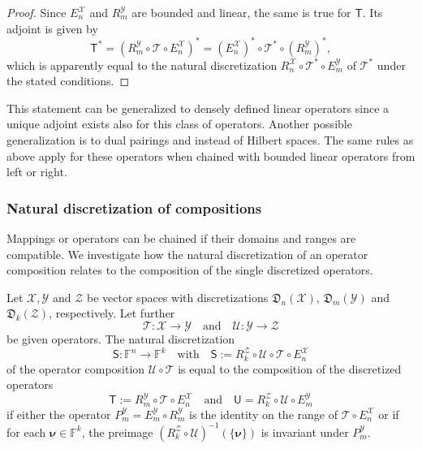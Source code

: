\documentclass[a4paper]{paper}
\newcommand{\Discr}{\mathfrak{D}}
\newcommand{\Spc}[1]{\mathscr{#1}}
\newcommand{\Field}{\mathbb{F}}
\newcommand{\Op}[1]{\mathcal{#1}}
\newcommand{\DiscOp}[1]{\mathsf{#1}}
\newcommand*{\EXT}[2]{\ensuremath{E_{#1}^{#2}}}
\newcommand*{\REST}[2]{\ensuremath{R_{#1}^{#2}}}
\newcommand*{\PROJ}[2]{\ensuremath{P_{#1}^{#2}}}
\newcommand*{\RnX}{\ensuremath{\REST{n}{\Spc{X}}}}
\newcommand*{\RmY}{\ensuremath{\REST{m}{\Spc{Y}}}}
\newcommand*{\EnX}{\ensuremath{\EXT{n}{\Spc{X}}}}
\newcommand*{\EmY}{\ensuremath{\EXT{m}{\Spc{Y}}}}
\newcommand*{\PmY}{\ensuremath{\PROJ{m}{\Spc{Y}}}}
\newcommand{\vnu}{\boldsymbol{\nu}}
\begin{document}
\begin{proof}
 Since $\EnX$ and $\RmY$ are bounded and linear, the same is true for $\DiscOp{T}$. Its adjoint is given by
 \begin{equation*}
  \DiscOp{T}^* = (\RmY \circ \Op{T} \circ \EnX)^* = (\EnX)^* \circ \Op{T}^* \circ (\RmY)^*,
 \end{equation*}
 which is apparently equal to the natural discretization $\RnX \circ \Op{T}^* \circ \EmY$ of $\Op{T}^*$ under the 
 stated conditions.
\end{proof}

\begin{remark}
 This statement can be generalized to densely defined linear operators since a unique adjoint exists also for this 
 class of operators. Another possible generalization is to dual pairings and instead of Hilbert spaces. The same rules 
 as above apply for these operators when chained with bounded linear operators from left or right.
\end{remark}


\subsubsection{Natural discretization of compositions}
\label{subsubsec:discr:operator:op_comp}

Mappings or operators can be chained if their domains and ranges are compatible. We investigate how the natural 
discretization of an operator composition relates to the composition of the single discretized operators.

\begin{lemma}
 \label{lemma:discr:operator:op_comp:natural_is_comp}
 Let $\Spc{X}, \Spc{Y}$ and $\Spc{Z}$ be vector spaces with discretizations $\Discr_n(\Spc{X})$, 
 $\Discr_m(\Spc{Y})$ and $\Discr_k(\Spc{Z})$, respectively. Let further
 \begin{equation*}
  \Op{T} \colon \Spc{X} \to \Spc{Y} \quad \text{and} \quad \Op{U} \colon \Spc{Y} \to \Spc{Z}
 \end{equation*}
 be given operators. The natural discretization
 \begin{equation*}
  \DiscOp{S} \colon \Field^n \to \Field^k 
  \quad \text{with} \quad
  \DiscOp{S} := \REST{k}{\Spc{Z}} \circ \Op{U} \circ \Op{T} \circ \EnX
 \end{equation*}
 of the operator composition $\Op{U} \circ \Op{T}$ is equal to the composition of the discretized operators
 \begin{equation*}
  \DiscOp{T} := \RmY \circ \Op{T} \circ \EnX
  \quad \text{and} \quad
  \DiscOp{U} = \REST{k}{\Spc{Z}} \circ \Op{U} \circ \EmY
 \end{equation*}
 if either the operator $\PmY = \EmY \circ \RmY$ is the identity on the range of $\Op{T} \circ \EnX$ or if for each 
 $\vnu \in \Field^k$, the preimage $(\REST{k}{\Spc{Z}} \circ \Op{U})^{-1}(\{\vnu\})$ is invariant under 
 $\PmY$.
\end{lemma}
\end{document}
